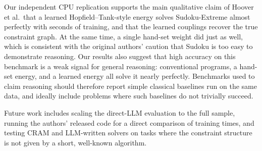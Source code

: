 \documentclass{article} %
\begin{document}
Our independent CPU replication supports the main qualitative claim of Hoover et al.\ that a learned Hopfield--Tank-style energy solves Sudoku-Extreme almost perfectly with seconds of training, and that the learned couplings recover the true constraint graph. At the same time, a single hand-set weight did just as well, which is consistent with the original authors' caution that Sudoku is too easy to demonstrate reasoning. Our results also suggest that high accuracy on this benchmark is a weak signal for general reasoning: conventional programs, a hand-set energy, and a learned energy all solve it nearly perfectly. Benchmarks used to claim reasoning should therefore report simple classical baselines run on the same data, and ideally include problems where such baselines do not trivially succeed.

Future work includes scaling the direct-LLM evaluation to the full sample, running the authors' released code for a direct comparison of training times, and testing CRAM and LLM-written solvers on tasks where the constraint structure is not given by a short, well-known algorithm.



\end{document}
